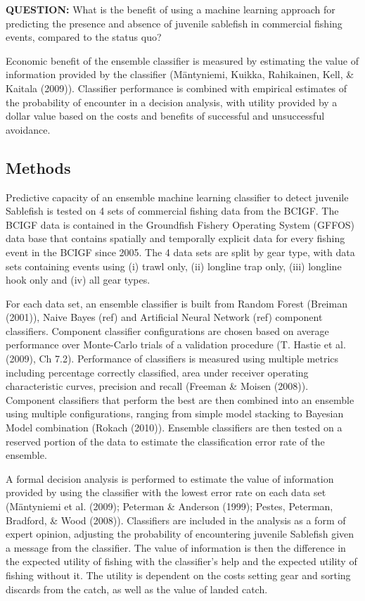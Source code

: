 \documentclass[12pt,]{scrartcl}
\begin{document}
\textbf{QUESTION:} What is the benefit of using a machine learning
approach for predicting the presence and absence of juvenile sablefish
in commercial fishing events, compared to the status quo?

Economic benefit of the ensemble classifier is measured by estimating
the value of information provided by the classifier (Mäntyniemi, Kuikka,
Rahikainen, Kell, \& Kaitala (2009)). Classifier performance is combined
with empirical estimates of the probability of encounter in a decision
analysis, with utility provided by a dollar value based on the costs and
benefits of successful and unsuccessful avoidance.

\subsection{Methods}\label{methods-3}

Predictive capacity of an ensemble machine learning classifier to detect
juvenile Sablefish is tested on 4 sets of commercial fishing data from
the BCIGF. The BCIGF data is contained in the Groundfish Fishery
Operating System (GFFOS) data base that contains spatially and
temporally explicit data for every fishing event in the BCIGF since
2005. The 4 data sets are split by gear type, with data sets containing
events using (i) trawl only, (ii) longline trap only, (iii) longline
hook only and (iv) all gear types.

For each data set, an ensemble classifier is built from Random Forest
(Breiman (2001)), Naive Bayes (ref) and Artificial Neural Network (ref)
component classifiers. Component classifier configurations are chosen
based on average performance over Monte-Carlo trials of a validation
procedure (T. Hastie et al. (2009), Ch 7.2). Performance of classifiers
is measured using multiple metrics including percentage correctly
classified, area under receiver operating characteristic curves,
precision and recall (Freeman \& Moisen (2008)). Component classifiers
that perform the best are then combined into an ensemble using multiple
configurations, ranging from simple model stacking to Bayesian Model
combination (Rokach (2010)). Ensemble classifiers are then tested on a
reserved portion of the data to estimate the classification error rate
of the ensemble.

A formal decision analysis is performed to estimate the value of
information provided by using the classifier with the lowest error rate
on each data set (Mäntyniemi et al. (2009); Peterman \& Anderson (1999);
Pestes, Peterman, Bradford, \& Wood (2008)). Classifiers are included in
the analysis as a form of expert opinion, adjusting the probability of
encountering juvenile Sablefish given a message from the classifier. The
value of information is then the difference in the expected utility of
fishing with the classifier's help and the expected utility of fishing
without it. The utility is dependent on the costs setting gear and
sorting discards from the catch, as well as the value of landed catch.
\end{document}
